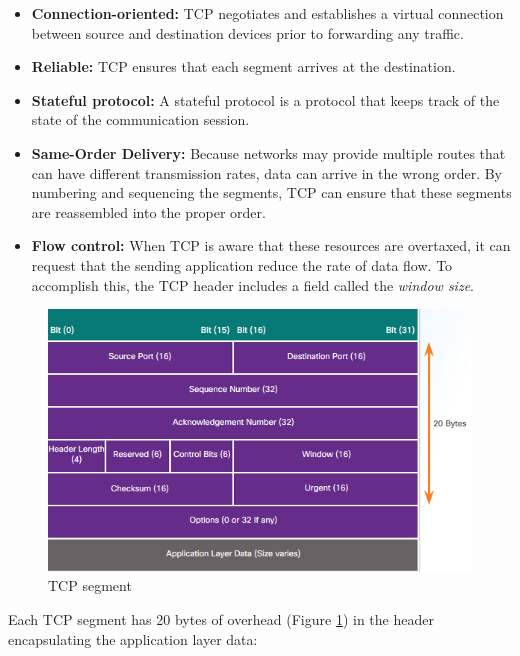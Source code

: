 \begin{itemize}
\item  \textbf{Connection-oriented:} TCP negotiates and establishes a virtual connection between source and destination devices prior to forwarding any traffic.

\item \textbf{Reliable:} TCP ensures that each segment arrives at the destination. 

\item \textbf{Stateful protocol:} A stateful protocol is a protocol that keeps track of the state of the communication session. 

\item \textbf{Same-Order Delivery:} Because networks may provide multiple routes that can have different transmission rates, data can arrive in the wrong order. By numbering and sequencing the segments, TCP can ensure that these segments are reassembled into the proper order.

\item \textbf{Flow control:} When TCP is aware that these resources are overtaxed, it can request that the sending application reduce the rate of data flow. To accomplish this, the TCP header includes a field called the \emph{window size}.
\end{itemize}

\begin{figure}[hbtp]
\caption{TCP segment}\label{TCPheader}
\centering
\includegraphics[scale=0.5]{pictures/TCPheader.PNG}
\end{figure}


Each TCP segment has 20 bytes of overhead (Figure \ref{TCPheader}) in the header encapsulating the application layer data:

